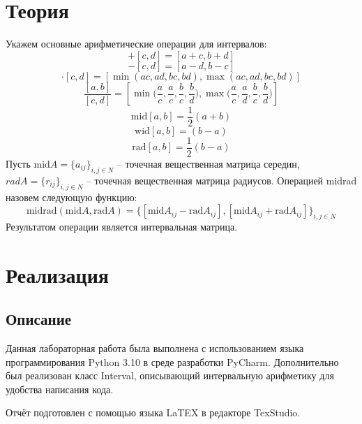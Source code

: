 \documentclass[a4paper,14pt]{article}
\begin{document}
	\section{Теория}
	Укажем основные арифметические операции для интервалов:
	\begin{equation}
		[a, b] + [c, d] = [a+c, b+d]
	\end{equation}
	\begin{equation}
		[a, b] - [c, d] = [a-d, b-c]
	\end{equation}
	\begin{equation}
	    [a, b] \cdot [c, d] = [\min(ac, ad, bc, bd), \max(ac, ad, bc, bd)]
	\end{equation}
	\begin{equation}
	    \frac{[a,b]}{[c,d]}=[\min\Big(\frac{a}{c}, \frac{a}{c}, \frac{b}{c}, \frac{b}{d}\Big), \max\Big(\frac{a}{c}, \frac{a}{d}, \frac{b}{c}, \frac{b}{d}\Big)]
	\end{equation}
	\begin{equation}
	   \text{mid}[a,b] = \frac{1}{2}(a+b)
	\end{equation}
	\begin{equation}
		\text{wid}[a,b] = (b-a)
	\end{equation}
	\begin{equation}
		\text{rad}[a,b] = \frac{1}{2}(b-a)
	\end{equation}
	Пусть $\text{mid} A = \{a_{ij} \}_{i,j \in N}$ – точечная вещественная матрица середин, $rad A = \{r_{ij}\}_{i,j \in N}$ – точечная вещественная матрица радиусов. Операцией midrad назовем следующую функцию:
	\begin{equation}
		\text{midrad}(\text{mid}A, \text{rad}A) = \{[\text{mid}A_{ij} - \text{rad} A_{ij} ], [\text{mid} A_{ij} + \text{rad} A_{ij} ]\}_{i,j \in N}
	\end{equation}
	Результатом операции является интервальная матрица.
	\section{Реализация}
	\subsection{Описание}
	Данная лабораторная работа была выполнена с использованием языка
	программирования Python 3.10 в среде разработки PyCharm.
	Дополнительно был реализован класс Interval, описывающий интервальную арифметику для удобства написания кода. 
	
	Отчёт подготовлен с помощью языка LaTEX в редакторе TexStudio.
\end{document}
